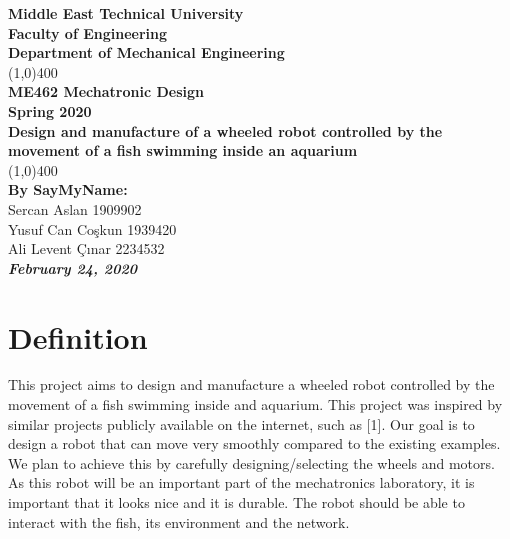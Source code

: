 \documentclass[12pt]{article}
\begin{document}
	
\begin{titlepage}
	\begin{center}
		\vspace*{1cm}
		\Large{\textbf{Middle East Technical University}\\
			\Large{\textbf{Faculty of Engineering}}\\
			\Large{\textbf{Department of Mechanical Engineering}}\\
			\line(1,0){400}\\[1mm]
			\huge{\textbf{ME462 Mechatronic Design\\ Spring 2020}}\\[3mm]
			\Large{\textbf{Design and manufacture of a wheeled robot controlled by the movement of a fish swimming inside an aquarium}}\\[1mm]
			\line(1,0){400}\\
			\vfill
			\textbf{By SayMyName:}\\
			Sercan Aslan  1909902\\
			Yusuf Can Coşkun  1939420\\
			Ali Levent Çınar  2234532\\
			\slshape {\textbf {February 24, 2020}}}\\
	\end{center}
\end{titlepage}
\tableofcontents
\cleardoublepage

\section{Definition}
This project aims to design and manufacture a wheeled robot controlled by the movement of a fish swimming inside and aquarium. This project was inspired by similar projects publicly available on the internet, such as [1]. Our goal is to design a robot that can move very smoothly compared to the existing examples. We plan to achieve this by carefully designing/selecting the wheels and motors. As this robot will be an important part of the mechatronics laboratory, it is important that it looks nice and it is durable. The robot should be able to interact with the fish, its environment and the network.

\end{document}
